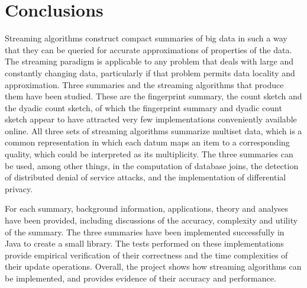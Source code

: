\chapter{Conclusions}
\label{ch:conclusions}

Streaming algorithms construct compact summaries of big data in such a way that they can be queried for accurate approximations of properties of the data.
The streaming paradigm is applicable to any problem that deals with large and constantly changing data, particularly if that problem permits data locality and approximation.
Three summaries and the streaming algorithms that produce them have been studied.
These are the fingerprint summary, the count sketch and the dyadic count sketch, of which the fingerprint summary and dyadic count sketch appear to have attracted very few implementations conveniently available online.
All three sets of streaming algorithms summarize multiset data, which is a common representation in which each datum maps an item to a corresponding quality, which could be interpreted as its multiplicity.
The three summaries can be used, among other things, in the computation of database joins, the detection of distributed denial of service attacks, and the implementation of differential privacy.

For each summary, background information, applications, theory and analyses have been provided, including discussions of the accuracy, complexity and utility of the summary.
The three summaries have been implemented successfully in Java to create a small library.
The tests performed on these implementations provide empirical verification of their correctness and the time complexities of their update operations.
Overall, the project shows how streaming algorithms can be implemented, and provides evidence of their accuracy and performance.
